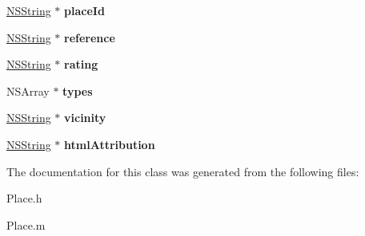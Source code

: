 \begin{DoxyCompactItemize}
\item 
\hypertarget{interface_place_adb7bb39042ba9a4b3ab51fe359d8516b}{
\hyperlink{class_n_s_string}{\-N\-S\-String} $\ast$ {\bfseries place\-Id}}
\label{interface_place_adb7bb39042ba9a4b3ab51fe359d8516b}

\item 
\hypertarget{interface_place_a4e56379341365b0ad18f3483a8004a42}{
\hyperlink{class_n_s_string}{\-N\-S\-String} $\ast$ {\bfseries reference}}
\label{interface_place_a4e56379341365b0ad18f3483a8004a42}

\item 
\hypertarget{interface_place_acc697f7cd0e08b8f48a3c0808d7b0098}{
\hyperlink{class_n_s_string}{\-N\-S\-String} $\ast$ {\bfseries rating}}
\label{interface_place_acc697f7cd0e08b8f48a3c0808d7b0098}

\item 
\hypertarget{interface_place_acf5d2d2b9bf43d6afb225992d4222811}{
\-N\-S\-Array $\ast$ {\bfseries types}}
\label{interface_place_acf5d2d2b9bf43d6afb225992d4222811}

\item 
\hypertarget{interface_place_aef36487d4eb51ba31be7aeafd16317ee}{
\hyperlink{class_n_s_string}{\-N\-S\-String} $\ast$ {\bfseries vicinity}}
\label{interface_place_aef36487d4eb51ba31be7aeafd16317ee}

\item 
\hypertarget{interface_place_a3edcc3b6106235c7726ea9878eaf0755}{
\hyperlink{class_n_s_string}{\-N\-S\-String} $\ast$ {\bfseries html\-Attribution}}
\label{interface_place_a3edcc3b6106235c7726ea9878eaf0755}

\end{DoxyCompactItemize}


\-The documentation for this class was generated from the following files\-:\begin{DoxyCompactItemize}
\item 
\-Place.\-h\item 
\-Place.\-m\end{DoxyCompactItemize}
